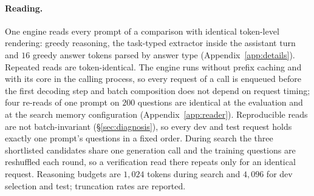 \paragraph{Reading.} One engine reads every prompt of a comparison with identical token-level
rendering: greedy reasoning, the task-typed extractor inside the assistant turn and $16$ greedy
answer tokens parsed by answer type (Appendix~\ref{app:details}). Repeated reads are
token-identical. The engine runs without prefix caching and with its core in the calling process,
so every request of a call is enqueued before the first decoding step and batch composition does
not depend on request timing; four re-reads of one prompt on $200$ questions are identical at the
evaluation and at the search memory configuration (Appendix~\ref{app:reader}). Reproducible reads
are not batch-invariant (\S\ref{sec:diagnosis}), so every dev and test request holds exactly one
prompt's questions in a fixed order. During search the three shortlisted candidates share one
generation call and the training questions are reshuffled each round, so a verification read there
repeats only for an identical request. Reasoning budgets are $1{,}024$ tokens during search and
$4{,}096$ for dev selection and test; truncation rates are reported.
